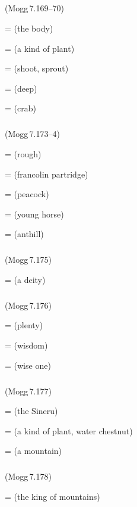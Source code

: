 \subparagraph*{} (Mogg\,7.169--70)\label{pacckx:kiira}

 =  (the body)\par
{} =  (a kind of plant)\par
{} =  (shoot, sprout)\par
{} =  (deep)\par
{} =  (crab)\par

\subparagraph*{} (Mogg\,7.173--4)\label{pacckx:ora}

 =  (rough)\par
{} =  (francolin partridge)\par
{} =  (peacock)\par
{} =  (young horse)\par
{} =  (anthill)\par

\subparagraph*{} (Mogg\,7.175)\label{pacckx:eraka}

 =  (a deity)\par

\subparagraph*{} (Mogg\,7.176)\label{pacckx:rika}

 =  (plenty)\par
{} =  (wisdom)\par
{} =  (wise one)\par

\subparagraph*{} (Mogg\,7.177)\label{pacckx:ru}

 =  (the Sineru)\par
{} =  (a kind of plant, water chestnut)\par
{} =  (a mountain)\par

\subparagraph*{} (Mogg\,7.178)\label{pacckx:eru}

 =  (the king of mountains)\par

